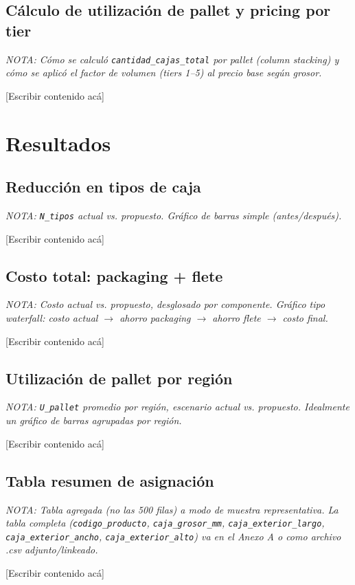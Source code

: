 \documentclass[11pt]{article}
\newcommand{\nota}[1]{{\itshape\color{notegray}\small NOTA: #1}\par\vspace{2pt}}
\newcommand{\placeholder}{\color{placeholdergray}[Escribir contenido acá]\color{black}\par\vspace{6pt}}
\begin{document}
\subsection{Cálculo de utilización de pallet y pricing por tier}
\nota{Cómo se calculó \texttt{cantidad\_cajas\_total} por pallet (column stacking) y cómo se aplicó el factor de volumen (tiers 1--5) al precio base según grosor.}
\placeholder

\section{Resultados}

\subsection{Reducción en tipos de caja}
\nota{\texttt{N\_tipos} actual vs. propuesto. Gráfico de barras simple (antes/después).}
\placeholder

\subsection{Costo total: packaging + flete}
\nota{Costo actual vs. propuesto, desglosado por componente. Gráfico tipo waterfall: costo actual $\rightarrow$ ahorro packaging $\rightarrow$ ahorro flete $\rightarrow$ costo final.}
\placeholder

\subsection{Utilización de pallet por región}
\nota{\texttt{U\_pallet} promedio por región, escenario actual vs. propuesto. Idealmente un gráfico de barras agrupadas por región.}
\placeholder

\subsection{Tabla resumen de asignación}
\nota{Tabla agregada (no las 500 filas) a modo de muestra representativa. La tabla completa (\texttt{codigo\_producto}, \texttt{caja\_grosor\_mm}, \texttt{caja\_exterior\_largo}, \texttt{caja\_exterior\_ancho}, \texttt{caja\_exterior\_alto}) va en el Anexo A o como archivo .csv adjunto/linkeado.}
\placeholder

\end{document}
